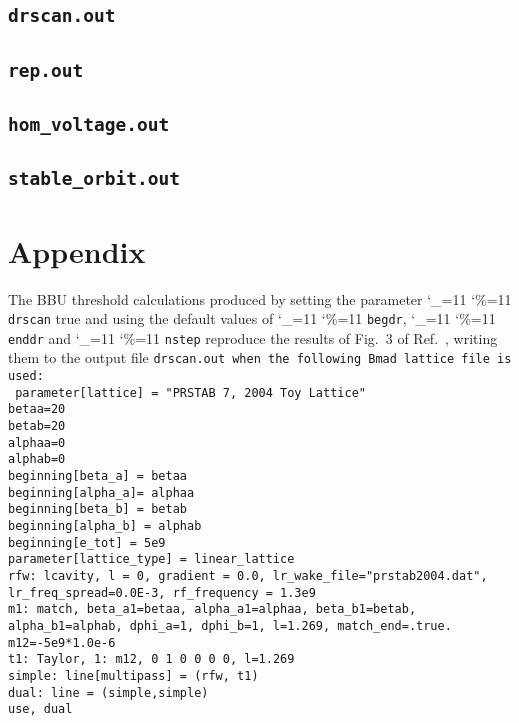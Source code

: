 \documentclass[11pt]{article}
\newcommand\ttcmd{\begingroup\catcode`\_=11 \catcode`\%=11 \dottcmd}
\newcommand\dottcmd[1]{\texttt{#1}\endgroup}
\newcommand{\vn}{\ttcmd}
\begin{document}
{\subsection{\tt{drscan.out}}
\subsection{\tt{rep.out}}
\subsection{\tt{hom_voltage.out}}
\subsection{\tt{stable_orbit.out}}

\section{Appendix}
The BBU threshold calculations produced by setting the parameter \vn{drscan}
true and using the default values of \vn{begdr}, \vn{enddr} and \vn{nstep} reproduce
the results of Fig.~3 of Ref.~\cite{ref:Hoffstaetter04}, writing them to
the output file \tt{drscan.out} when the following Bmad lattice file is used:\\
\tt{
parameter[lattice] = "PRSTAB 7, 2004 Toy Lattice"\\
betaa=20\\
betab=20\\
alphaa=0\\
alphab=0\\
beginning[beta_a]  =    betaa\\
beginning[alpha_a]=   alphaa\\
beginning[beta_b] =    betab\\
beginning[alpha_b] =   alphab\\
beginning[e_tot] = 5e9\\
parameter[lattice_type] = linear_lattice\\
rfw: lcavity, l = 0, gradient = 0.0, lr_wake_file="prstab2004.dat", lr_freq_spread=0.0E-3, rf_frequency = 1.3e9\\
m1: match, beta_a1=betaa, alpha_a1=alphaa, beta_b1=betab, alpha_b1=alphab, dphi_a=1, dphi_b=1, l=1.269, match_end=.true.\\
m12=-5e9*1.0e-6\\
t1: Taylor, {1:   m12,  0 1 0 0 0 0}, l=1.269\\
simple: line[multipass] = (rfw, t1)\\
dual: line = (simple,simple)\\
use, dual\\
}

}
\end{document}
